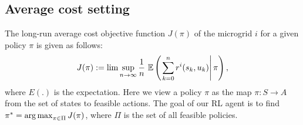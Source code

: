 \subsection{Average cost setting}
The long-run average cost objective function $J(\pi)$ of the microgrid $i$ for a given policy $\pi$ is given as follows:
\begin{align}
J(\pi) := \lim \sup_{n \rightarrow \infty}\frac{1}{n} \,\, \mathbb{E} \left(\left.\sum_{k = 0}^{n} r^{i} (s_{k},u_{k})\right|\pi \right),
\end{align}
where $E(.)$ is the expectation. Here we view a policy $\pi$ as the map $\pi : S \to A$ from the set of states to feasible actions. The goal of our RL agent is to find $\pi^* = \mathop{\rm arg\,max}_{\pi \in \Pi} J(\pi)$, where $\Pi$ is the set of all feasible policies.

%
%

